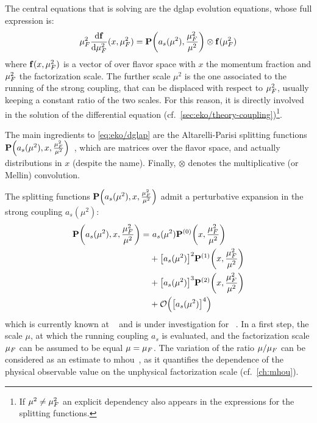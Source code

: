 
The central equations that \eko is solving are the \acrfull{dglap} evolution
equations, whose full expression is:
\begin{equation}
  \muF^2 \dv{\vb f}{\muF^2}{}(x,\muF^2) = \vb P\qty(a_s(\mu^2),\frac{\muF^2}{\mu^2}) \otimes \vb f(\muF^2)
	\label{eq:eko/dglap}
\end{equation}
where $\vb f(x,\mu_F^2)$ is a vector of \pdfs over flavor space with $x$ the
momentum fraction and $\mu_F^2$ the factorization scale.
The further scale $\mu^2$ is the one associated to the running of the strong
coupling, that can be displaced with respect to $\mu_F^2$, usually keeping a
constant ratio of the two scales.
For this reason, it is directly involved in the solution of the differential
equation (cf.\ \cref{sec:eko/theory-coupling})\footnote{
  If $\mu^2 \neq \mu_F^2$ an explicit dependency also appears in the expressions
  for the splitting functions.
}.

The main ingredients to \cref{eq:eko/dglap} are the Altarelli-Parisi splitting
functions $\vb
P\qty(a_s(\mu^2),x,\frac{\mu_F^2}{\mu^2})$~\cite{Moch:2004pa,Vogt:2004mw}, which
are matrices over the flavor space, and actually distributions in $x$ (despite
the name).
Finally, $\otimes$ denotes the multiplicative (or Mellin) convolution.

The splitting functions $\vb P\qty(a_s(\mu^2),x,\frac{\mu_F^2}{\mu^2})$ admit a
perturbative expansion in the strong coupling $a_s(\mu^2)$:
\begin{align}
  \vb P\qty(a_s(\mu^2),x,\frac{\muF^2}{\mu^2}) =
  &~ a_s(\mu^2) \vb P^{(0)}\qty(x,\frac{\muF^2}{\mu^2})\nonumber\\
  &+ \qty[a_s(\mu^2)]^2 \vb P^{(1)}\qty(x,\frac{\muF^2}{\mu^2})\nonumber\\
  &+ \qty[a_s(\mu^2)]^3 \vb P^{(2)}\qty(x,\frac{\muF^2}{\mu^2})\nonumber\\
  &+ \order{\qty[a_s(\mu^2)]^4}
\end{align}
which is currently known at \nnlo{}~\cite{Moch:2004pa,Vogt:2004mw,Blumlein:2021enk} and is under
investigation for \nnnlo{}~\cite{Moch:2021qrk}.
In a first step, the scale $\mu$, at which the running coupling $a_s$ is
evaluated, and the factorization scale $\mu_F$ can be assumed to be equal $\mu =
\mu_F$.
The variation of the ratio $\mu/\mu_F$ can be considered as an estimate to
\acrfull{mhou}~\cite{AbdulKhalek:2019ihb}, as it quantifies the dependence of
the physical observable value on the unphysical factorization scale (cf.\
\cref{ch:mhou}).


